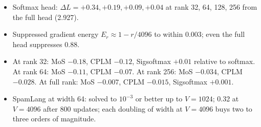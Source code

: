 \begin{itemize}
\item Softmax head: $\Delta L = +0.34, +0.19, +0.09, +0.04$ at rank 32, 64, 128, 256 from the full head (2.927).
\item Suppressed gradient energy $E_r \approx 1 - r/4096$ to within 0.003; even the full head suppresses 0.88.
\item At rank 32: MoS $-0.18$, CPLM $-0.12$, Sigsoftmax $+0.01$ relative to softmax. At rank 64: MoS $-0.11$, CPLM $-0.07$. At rank 256: MoS $-0.034$, CPLM $-0.028$. At full rank: MoS $-0.007$, CPLM $-0.015$, Sigsoftmax $+0.001$.
\item SpamLang at width 64: solved to $10^{-3}$ or better up to $V=1024$; 0.32 at $V=4096$ after 800 updates; each doubling of width at $V=4096$ buys two to three orders of magnitude.
\end{itemize}

